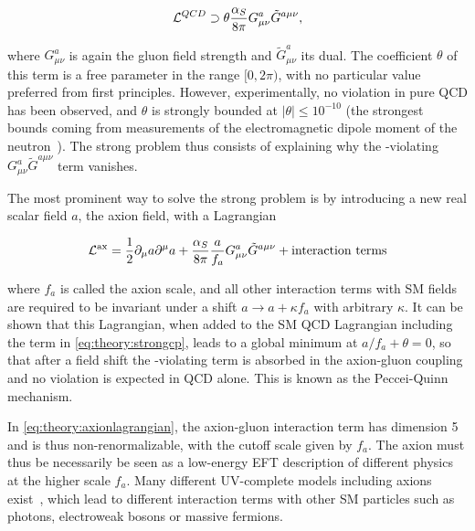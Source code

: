 \begin{equation}
\label{eq:theory:strongcp}
    \mathcal{L}^{QCD} \supset \theta \frac{\alpha_S}{8 \pi} G^{a}_{\mu \nu} \tilde{G}^{a \mu \nu},
\end{equation}

\noindent where $G^{a}_{\mu \nu}$ is again the gluon field strength and $\tilde{G}^{a}_{\mu \nu}$ its dual. The coefficient $\theta$ of this term is a free parameter in the range $[0,2\pi)$, with no particular value preferred from first principles. However, experimentally, no \CP violation in pure QCD has been observed, and $\theta$ is strongly bounded at $|\theta| \leq 10^{-10}$ (the strongest bounds coming from measurements of the electromagnetic dipole moment of the neutron~\cite{DiLuzio:2020wdo,Pendlebury:2015lrz,Abel:2020pzs}). The strong \CP problem thus consists of explaining why the \CP-violating $G^{a}_{\mu \nu} \tilde{G}^{a \mu \nu}$ term vanishes.

The most prominent way to solve the strong \CP problem is by introducing a new real scalar field $a$, the axion field, with a Lagrangian~\cite{DiLuzio:2020wdo}

\begin{equation}
\label{eq:theory:axionlagrangian}
    \mathcal{L}^{\mathrm{ax}} = \frac{1}{2} \partial_\mu a \partial^\mu a + \frac{\alpha_S}{8 \pi} \frac{a}{f_a} G^{a}_{\mu \nu} \tilde{G}^{a \mu \nu} + \text{interaction terms}
\end{equation}

\noindent where $f_a$ is called the axion scale, and all other interaction terms with SM fields are required to be invariant under a shift $a \rightarrow a + \kappa f_a$ with arbitrary $\kappa$. It can be shown that this Lagrangian, when added to the SM QCD Lagrangian including the term in \cref{eq:theory:strongcp}, leads to a global minimum at $a/f_a + \theta = 0$, so that after a field shift the \CP-violating term is absorbed in the axion-gluon coupling and no \CP violation is expected in QCD alone. This is known as the Peccei-Quinn mechanism.

In \cref{eq:theory:axionlagrangian}, the axion-gluon interaction term has dimension 5 and is thus non-renormalizable, with the cutoff scale given by $f_a$. The axion must thus be necessarily be seen as a low-energy EFT description of different physics at the higher scale $f_a$. Many different UV-complete models including axions exist~\cite{DiLuzio:2020wdo,Kim:1979if,Shifman:1979if,Dine:1981rt,Zhitnitsky:1980tq}, which lead to different interaction terms with other SM particles such as photons, electroweak bosons or massive fermions.

